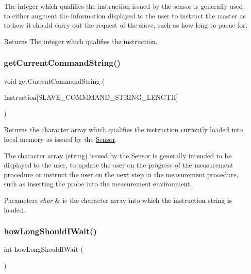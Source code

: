 The integer which qualifies the instruction issued by the sensor is generally used to either augment the information displayed to the user to instruct the master as to how it should carry out the request of the slave, such as how long to pasue for. \begin{DoxyReturn}{Returns}
The integer which qualifies the instruction. 
\end{DoxyReturn}
\mbox{\label{class_instructor_a8c66f480a7b5a6b434f613bc7197e824}} 
\subsubsection{\texorpdfstring{getCurrentCommandString()}{getCurrentCommandString()}}
{\footnotesize\ttfamily void get\+Current\+Command\+String (\begin{DoxyParamCaption}\item[{char}]{Instruction\mbox{[}\+S\+L\+A\+V\+E\+\_\+\+C\+O\+M\+M\+M\+A\+N\+D\+\_\+\+S\+T\+R\+I\+N\+G\+\_\+\+L\+E\+N\+G\+T\+H\mbox{]} }\end{DoxyParamCaption})}



Returns the character array which qualifies the instruction currently loaded into local memory as issued by the \mbox{\hyperlink{class_sensor}{Sensor}}. 

The character array (string) issued by the \mbox{\hyperlink{class_sensor}{Sensor}} is generally intended to be displayed to the user, to update the user on the progress of the measurement procedure or instruct the user on the next step in the measurement procedure, such as inserting the probe into the measurement environment. 
\begin{DoxyParams}{Parameters}
{\em char} & is the character array into which the instruction string is loaded. \\
\hline
\end{DoxyParams}
\mbox{\label{class_instructor_a2e9afbb8e6ce1c671e8e9dc29cf4715f}} 
\subsubsection{\texorpdfstring{howLongShouldIWait()}{howLongShouldIWait()}}
{\footnotesize\ttfamily int how\+Long\+Should\+I\+Wait (\begin{DoxyParamCaption}\item[{void}]{ }\end{DoxyParamCaption})}



